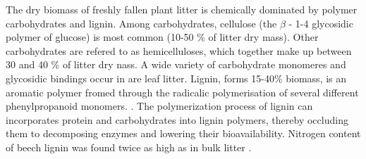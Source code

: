 The dry biomass of freshly fallen plant litter is chemically dominated by polymer carbohydrates and lignin. Among carbohydrates, cellulose (the $\beta$ - 1-4 glycosidic polymer of glucose) is most common (10-50 \% of litter dry mass). Other carbohydrates are refered to as hemicelluloses, which together make up between 30 and 40 \% of litter dry nass. A wide variety of carbohydrate monomeres and glycosidic bindings occur in are leaf litter. Lignin, forms 15-40\% biomass, is an aromatic polymer fromed through the radicalic polymerisation of several different phenylpropanoid monomers. \citep[pp. 54f]{Berg2008}.  The polymerization process of lignin can incorporates protein and carbohydrates into lignin polymers, thereby occluding them to decomposing enzymes and lowering their bioavailability. Nitrogen content of beech lignin was found twice as high as in bulk litter \citep{Dykmans2002}. 





